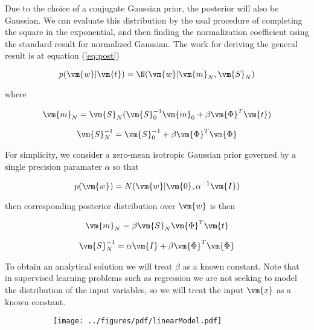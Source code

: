 \documentclass[a4paper,10pt]{article}
\begin{document}
Due to the choice of a conjugate Gaussian prior, the posterior will also be Gaussian.
We can evaluate this distribution by the usal procedure of completing the square in the exponential, and then finding the normalization coefficient using the standard result for normalized Gaussian.
The work for deriving the general result is at equation (\ref{eq:post})

\begin{equation}
 p(\vm{w}|\vm{t}) = \N(\vm{w}|\vm{m}_N, \vm{S}_N)
\end{equation}

where 

\begin{equation}
 \vm{m}_N = \vm{S}_N (\vm{S}_0^{-1} \vm{m}_0 + \beta \vm{\Phi}^T \vm{t})
\end{equation}

\begin{equation}
 \vm{S}_N^{-1} = \vm{S}_0^{-1} + \beta \vm{\Phi}^T\vm{\Phi}
\end{equation}

For simplicity, we consider a zero-mean isotropic Gaussian prior governed by a single precision paramater $\alpha$ so that

\begin{equation}
 p(\vm{w}) = N(\vm{w}|\vm{0}, \alpha^{-1} \vm{I})
\end{equation}

then corresponding posterior distribution over $\vm{w}$ is then 


\begin{equation}
 \vm{m}_N = \beta  \vm{S}_N\vm{\Phi}^T \vm{t}
\end{equation}

\begin{equation}
 \vm{S}_N^{-1} = \alpha \vm{I} + \beta \vm{\Phi}^T\vm{\Phi}
\end{equation}


To obtain an analytical solution we will treat $\beta$ as a known constant.
Note that in supervised learning problems such as regression we are not seeking to model the distribution of the input variables, so we will treat the input $\vm{x}$ as a known constant.


\begin{figure}[H]
\begin{subfigure}[t]{0.32\textwidth}
\texttt{[image: ../figures/pdf/linearModel.pdf]}
\end{subfigure}
\end{figure}
\end{document}
